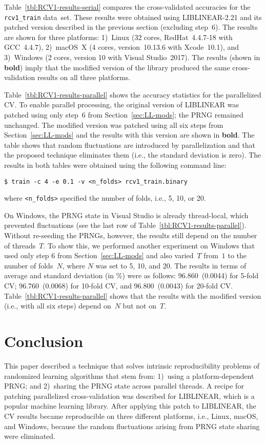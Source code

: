 Table~\ref{tbl:RCV1-results-serial} compares the cross-validated
accuracies for the \verb|rcv1_train| data~set\supercite{lewis2004rcv1}.
These results were obtained using LIBLINEAR-2.21 and its patched version
described in the previous section (excluding step~6). The results are shown for three platforms:
1)~Linux (32 cores, RedHat~4.4.7-18 with GCC~4.4.7), \mbox{2) macOS X} (4 cores,
version~10.13.6 with Xcode~10.1), and \mbox{3) Windows} (2 cores, version 10
with Visual Studio~2017). The results (shown in \textbf{bold}) imply that the
 modified version of the library produced the same cross-validation results on
 all three platforms.

\smallskip
Table~\ref{tbl:RCV1-results-parallel} shows the accuracy statistics for the
parallelized CV. To enable parallel processing, the original version of
LIBLINEAR was patched using only step~6 from Section~\ref{sec:LL-mods}; the PRNG
remained unchanged. The modified version was patched using all six steps
from Section~\ref{sec:LL-mods} and the results with this version are shown in
\textbf{bold}. The table shows that random fluctuations are introduced by
parallelization and that the proposed technique eliminates them (i.e., the
standard deviation is zero). The results in both tables were obtained using the
following command line:
\begin{Verbatim}[fontsize=\small]
$ train -c 4 -e 0.1 -v <n_folds> rcv1_train.binary
\end{Verbatim}
where {\small\verb|<n_folds>|} specified the number of folds, i.e., 5, 10, or 20.

\smallskip
On Windows, the PRNG
state in Visual Studio is already thread-local, which prevented fluctuations
(see the last row of Table~\ref{tbl:RCV1-results-parallel}).
Without re-seeding the PRNGs, however, the results still depend on the number of
threads~$T$. To show this, we performed another experiment on Windows that used
only step 6 from Section~\ref{sec:LL-mods} and also varied~$T$ from~$1$ to the
number of folds~$N$, where $N$ was set to 5, 10, and 20. The results in terms of
average and standard deviation (in \%) were as follows:
96.860~(0.0044) for 5-fold CV; 96.760~(0.0068) for 10-fold CV, and
96.800~(0.0043) for 20-fold CV. Table~\ref{tbl:RCV1-results-parallel} shows that
the results with the modified version (i.e., with all six steps)
depend on~$N$ but not on~$T$.



\section{Conclusion}

This paper described a technique that solves intrinsic
reproducibility problems of randomized learning algorithms that stem from:
1)~using a platform-dependent PRNG; and 2)~sharing the PRNG state across parallel
threads.
A recipe for patching parallelized cross-validation was described for LIBLINEAR,
which is a popular machine learning library. After applying this patch to
LIBLINEAR, the CV results became reproducible on three different platforms, i.e.,
Linux, macOS, and Windows, because the random fluctuations arising from PRNG
state sharing were eliminated.
